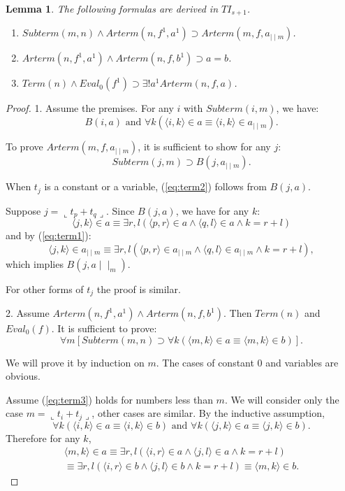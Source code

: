 \documentclass{asl}
\newtheorem{lemma}{Lemma}[section]
\theoremstyle{definition}
\begin{document}
\begin{lemma}
The following formulas are derived in $TI_{s+1}$.
\begin{enumerate}
\item $Subterm(m,n)\wedge Arterm(n,f^1,a^1)\supset Arterm(m,f,a_{\mid\mid m})$.
\medskip
\item $Arterm(n,f^1,a^1)\wedge Arterm(n,f,b^1)\supset a=b$.
\medskip
\item $Term(n)\wedge Eval_0(f^1)\supset\exists ! a^1 Arterm(n,f,a)$.
\end{enumerate}
\label{lemma:term2}
\end{lemma}
\begin{proof}
1. Assume the premises. For any $i$ with $Subterm(i,m)$, we have:
\begin{equation}
B(i,a) \text{ and }\forall k\left(\langle i,k\rangle\in a\equiv\langle i,k\rangle\in a_{\mid\mid m} \right).
\label{eq:term1}
\end{equation}

To prove $Arterm(m,f,a_{\mid\mid m})$, it is sufficient to show for any $j$:
\begin{equation}
Subterm(j,m)\supset B(j,a_{\mid\mid m}).
\label{eq:term2}
\end{equation}

When $t_j$ is a constant or a variable, (\ref{eq:term2}) follows from $B(j,a)$. 

Suppose $j=\llcorner t_p+t_q\lrcorner$. Since $B(j,a)$, we have for any $k$:
\[\langle j,k\rangle\in a
\equiv\exists r,l(\langle p,r\rangle\in a\wedge\langle q,l\rangle\in a\wedge k=r+l)\]
and by (\ref{eq:term1}):
\[\langle j,k\rangle\in a_{\mid\mid m}
\equiv\exists r,l(\langle p,r\rangle\in a_{\mid\mid m}\wedge\langle q,l\rangle\in a_{\mid\mid m}\wedge k=r+l),\]
which implies $B(j,a\mid\mid_m)$.

For other forms of $t_j$ the proof is similar.

2. Assume $Arterm(n,f^1,a^1)\wedge Arterm(n,f,b^1)$. Then $Term(n)$ and $Eval_0(f)$. It is sufficient to prove:
\begin{equation}
\forall m\left[Subterm(m,n)\supset \forall k(\langle m,k\rangle\in a\equiv\langle m,k\rangle\in b)\right].
\label{eq:term3}
\end{equation}

We will prove it by induction on $m$. The cases of constant 0 and variables are obvious.

Assume (\ref{eq:term3}) holds for numbers less than $m$. We will consider only the case $m=\llcorner t_i+t_j\lrcorner$, other cases are similar. By the inductive assumption, 
\[\forall k(\langle i,k\rangle\in a\equiv\langle i,k\rangle\in b)\text{ and }
\forall k(\langle j,k\rangle\in a\equiv\langle j,k\rangle\in b).\]
Therefore for any $k$,
\begin{multline*}
\langle m,k\rangle\in a\equiv
\exists r,l(\langle i,r\rangle\in a\wedge \langle j,l\rangle\in a\wedge k=r+l)
\\
\equiv
\exists r,l(\langle i,r\rangle\in b\wedge \langle j,l\rangle\in b\wedge k=r+l)\equiv
\langle m,k\rangle\in b.
\end{multline*}


\end{proof}
\end{document}
